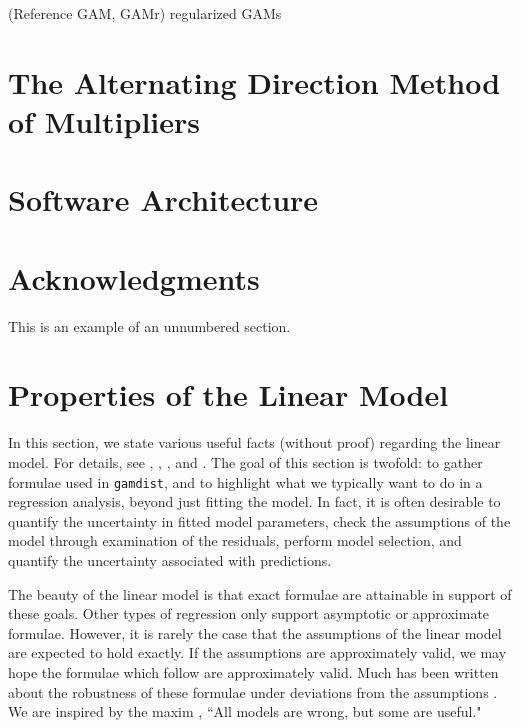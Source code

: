 \documentclass[12pt]{article}
\newcommand{\gamdist}{\texttt{gamdist}}
\begin{document}
(Reference GAM, GAMr) regularized GAMs 

\section{The Alternating Direction Method of Multipliers}
\label{sec:admm}

\section{Software Architecture}
\label{sec:arch}

\section*{Acknowledgments}

This is an example of an unnumbered section.

\appendix

\section{Properties of the Linear Model}
\label{app:linear_model}

In this section, we state various useful facts (without proof) regarding the linear model. For details, see \cite{Weisberg:2005}, \cite{Seber:2003}, \cite{Wood:2017}, and \cite{CB:2001}. The goal of this section is twofold: to gather formulae used in \gamdist{}, and to highlight what we typically want to do in a regression analysis, beyond just fitting the model. In fact, it is often desirable to quantify the uncertainty in fitted model parameters, check the assumptions of the model through examination of the residuals, perform model selection, and quantify the uncertainty associated with predictions.

The beauty of the linear model is that exact formulae are attainable in support of these goals. Other types of regression only support asymptotic or approximate formulae. However, it is rarely the case that the assumptions of the linear model are expected to hold exactly. If the assumptions are approximately valid, we may hope the formulae which follow are approximately valid. Much has been written about the robustness of these formulae under deviations from the assumptions \cite[\S 9]{Seber:2003}. We are inspired by the maxim \cite{Box:1987}, ``All models are wrong, but some are useful."
\end{document}
